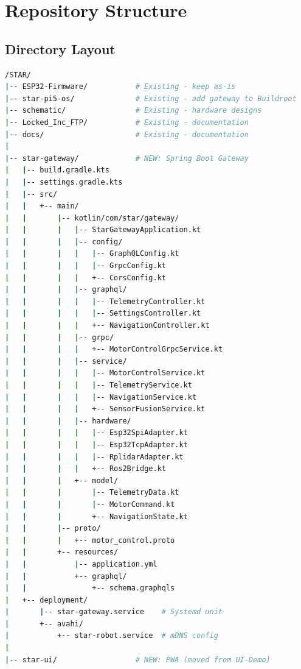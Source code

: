 \section{Repository Structure}

\subsection{Directory Layout}

\begin{lstlisting}[language=bash, caption=Complete Repository Structure]
/STAR/
|-- ESP32-Firmware/           # Existing - keep as-is
|-- star-pi5-os/              # Existing - add gateway to Buildroot
|-- schematic/                # Existing - hardware designs
|-- Locked_Inc_FTP/           # Existing - documentation
|-- docs/                     # Existing - documentation
|
|-- star-gateway/             # NEW: Spring Boot Gateway
|   |-- build.gradle.kts
|   |-- settings.gradle.kts
|   |-- src/
|   |   +-- main/
|   |       |-- kotlin/com/star/gateway/
|   |       |   |-- StarGatewayApplication.kt
|   |       |   |-- config/
|   |       |   |   |-- GraphQLConfig.kt
|   |       |   |   |-- GrpcConfig.kt
|   |       |   |   +-- CorsConfig.kt
|   |       |   |-- graphql/
|   |       |   |   |-- TelemetryController.kt
|   |       |   |   |-- SettingsController.kt
|   |       |   |   +-- NavigationController.kt
|   |       |   |-- grpc/
|   |       |   |   +-- MotorControlGrpcService.kt
|   |       |   |-- service/
|   |       |   |   |-- MotorControlService.kt
|   |       |   |   |-- TelemetryService.kt
|   |       |   |   |-- NavigationService.kt
|   |       |   |   +-- SensorFusionService.kt
|   |       |   |-- hardware/
|   |       |   |   |-- Esp32SpiAdapter.kt
|   |       |   |   |-- Esp32TcpAdapter.kt
|   |       |   |   |-- RplidarAdapter.kt
|   |       |   |   +-- Ros2Bridge.kt
|   |       |   +-- model/
|   |       |       |-- TelemetryData.kt
|   |       |       |-- MotorCommand.kt
|   |       |       +-- NavigationState.kt
|   |       |-- proto/
|   |       |   +-- motor_control.proto
|   |       +-- resources/
|   |           |-- application.yml
|   |           +-- graphql/
|   |               +-- schema.graphqls
|   +-- deployment/
|       |-- star-gateway.service    # Systemd unit
|       +-- avahi/
|           +-- star-robot.service  # mDNS config
|
|-- star-ui/                  # NEW: PWA (moved from UI-Demo)

\end{lstlisting}
